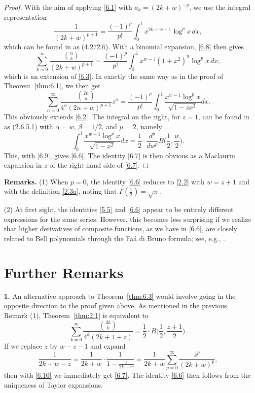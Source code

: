 \documentclass{amsart}
\theoremstyle{definition}
\theoremstyle{remark}
\numberwithin{equation}{section}
\begin{document}
\begin{proof}
With the aim of applying \eqref{6.1} with $a_k=(2k+w)^{-p}$, we use the 
integral representation
\begin{equation}\label{6.8}
\frac{1}{(2k+w)^{p+1}}
=\frac{(-1)^p}{p!}\int_0^1 x^{2k+w-1}\log^p{x}\,dx,
\end{equation}
which can be found in \cite[p.~551]{GR} as (4.272.6). With a binomial
expansion, \eqref{6.8} then gives
\[
\sum_{k=0}^n\frac{\binom{n}{k}}{(2k+w)^{p+1}}
=\frac{(-1)^p}{p!}\int_0^1 x^{w-1}(1+x^2)^n\log^p{x}\,dx,
\]
which is an extension of \eqref{6.3}. In exactly the same way as in the proof
of Theorem~\ref{thm:6.1}, we then get
\begin{equation}\label{6.9}
\sum_{n=0}^\infty\frac{\binom{2n}{n}}{4^n(2n+w)^{p+1}}z^n
=\frac{(-1)^p}{p!}\int_0^1\frac{x^{w-1}\log^p{x}}{\sqrt{1-zx^2}}dx.
\end{equation}
This obviously extends \eqref{6.2}. The integral on the right, for $z=1$, can 
be found in \cite{PrE} as (2.6.5.1) with $\alpha=w$, $\beta=1/2$, and $\mu=2$, 
namely
\[
\int_0^1\frac{x^{w-1}\log^p{x}}{\sqrt{1-x^2}}dx
=\frac{1}{2}\cdot\frac{d^p}{dw^p}B\big(\frac{1}{2},\frac{w}{2}\big).
\]
This, with \eqref{6.9}, gives \eqref{6.6}. The identity \eqref{6.7} is then
obvious as a Maclaurin expansion in $z$ of the right-hand side of \eqref{6.7}.
\end{proof}

\noindent
{\bf Remarks.} (1) When $p=0$, the identity \eqref{6.6} reduces to \eqref{2.2}
with $w=z+1$ and with the definition \eqref{2.3a}, noting that 
$\Gamma(\frac{1}{2})=\sqrt{\pi}$.

(2) At first sight, the identities \eqref{5.5} and \eqref{6.6} appear to be
entirely different expressions for the same series. However, this becomes 
less surprising if we realize that higher derivatives of composite functions,
as we have in \eqref{6.6}, are closely related to Bell polynomials through
the Fa\'a di Bruno formula; see, e.g., \cite[Sect.~3.4]{Co}.

\section{Further Remarks}\label{sec:7}

{\bf 1.} An alternative approach to Theorem~\ref{thm:6.3} would involve going in
the opposite direction to the proof given above. As mentioned in the previous
Remark (1), Theorem~\ref{thm:2.1} is equivalent to 
\begin{equation}\label{6.10}
\sum_{k=0}^\infty\frac{\binom{2k}{k}}{4^k(2k+1+z)}
=\frac{1}{2}\cdot B\big(\frac{1}{2},\frac{z+1}{2}\big).
\end{equation}
If we replace $z$ by $w-z-1$ and expand
\[
\frac{1}{2k+w-z}=\frac{1}{2k+w}\cdot\frac{1}{1-\frac{z}{2k+w}}
=\frac{1}{2k+w}\sum_{p=0}^\infty\frac{z^p}{(2k+w)^p},
\]
then with \eqref{6.10} we immediately get \eqref{6.7}. The identity \eqref{6.6}
then follows from the uniqueness of Taylor expansions.
\end{document}
